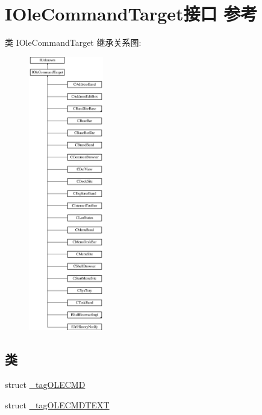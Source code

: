 \hypertarget{interface_i_ole_command_target}{}\section{I\+Ole\+Command\+Target接口 参考}
\label{interface_i_ole_command_target}
类 I\+Ole\+Command\+Target 继承关系图\+:\begin{figure}[H]
\begin{center}
\leavevmode
\includegraphics[height=12.000000cm]{interface_i_ole_command_target}
\end{center}
\end{figure}
\subsection*{类}
\begin{DoxyCompactItemize}
\item 
struct \hyperlink{struct_i_ole_command_target_1_1__tag_o_l_e_c_m_d}{\+\_\+tag\+O\+L\+E\+C\+MD}
\item 
struct \hyperlink{struct_i_ole_command_target_1_1__tag_o_l_e_c_m_d_t_e_x_t}{\+\_\+tag\+O\+L\+E\+C\+M\+D\+T\+E\+XT}
\end{DoxyCompactItemize}
